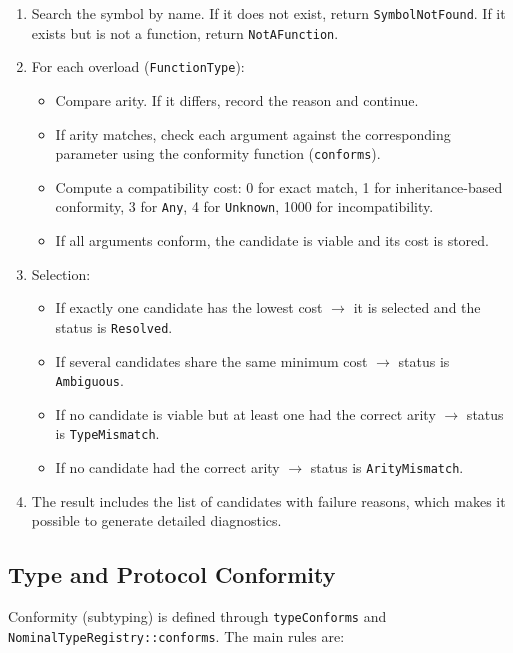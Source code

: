 \documentclass[12pt,a4paper]{report}
\begin{document}
\begin{enumerate}
    \item Search the symbol by name.
    If it does not exist, return \texttt{SymbolNotFound}. If it exists but is not a function, return \texttt{NotAFunction}.
    \item For each overload (\texttt{FunctionType}):
        \begin{itemize}
            \item Compare arity.
            If it differs, record the reason and continue.
            \item If arity matches, check each argument against the corresponding parameter using the conformity function (\texttt{conforms}).
            \item Compute a compatibility cost: 0 for exact match, 1 for inheritance-based conformity, 3 for \texttt{Any}, 4 for \texttt{Unknown}, 1000 for incompatibility.
            \item If all arguments conform, the candidate is viable and its cost is stored.
        \end{itemize}
    \item Selection:
        \begin{itemize}
            \item If exactly one candidate has the lowest cost $\to$ it is selected and the status is \texttt{Resolved}.
            \item If several candidates share the same minimum cost $\to$ status is \texttt{Ambiguous}.
            \item If no candidate is viable but at least one had the correct arity $\to$ status is \texttt{TypeMismatch}.
            \item If no candidate had the correct arity $\to$ status is \texttt{ArityMismatch}.
        \end{itemize}
    \item The result includes the list of candidates with failure reasons, which makes it possible to generate detailed diagnostics.
\end{enumerate}

\subsection{Type and Protocol Conformity}

Conformity (subtyping) is defined through \texttt{typeConforms} and \texttt{NominalTypeRegistry::conforms}.
The main rules are:
\end{document}
